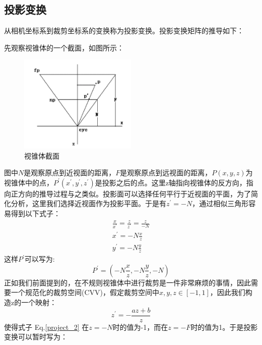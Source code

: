 	\subsection{投影变换}
	\begin{spacing}{2.5}
	从相机坐标系到裁剪坐标系的变换称为投影变换。投影变换矩阵的推导如下：
	\end{spacing}
		先观察视锥体的一个截面，如图所示：
		\begin{spacing}{2.5}
		\begin{figure}[H]
		\centering
		\includegraphics[width=0.5\textwidth]{images/project1.png}
		\caption{视锥体截面}
		\label{project1}
	\end{figure}
	图中$N$是观察原点到近视面的距离，$F$是观察原点到远视面的距离，$P(x,y,z)$为视锥体中的点，$P^{'}(x^{'},y^{'},z^{'})$是投影之后的点。这里z轴指向视锥体的反方向，指向正方向的推导过程与之类似。投影面可以选择任何平行于近视面的平面，为了简化分析，这里我们选择近视面作为投影平面。于是有$z^{'}=-N$，通过相似三角形容易得到以下式子：
	\begin{equation}
	\begin{split}
		\frac{x}{x^{'}}=\frac{z}{z^{'}}=\frac{z}{-N} \\
		x^{'} = -N\frac{x}{z} \\
		y^{'} = -N\frac{y}{z}
		\label{project_1}
	\end{split}
	\end{equation}
	这样$P^{'}$可以写为:
	\begin{equation}
		P^{'}=(-N\frac{x}{z},-N\frac{y}{z},-N)
	\end{equation}
	正如我们前面提到的，在不规则视锥体中进行裁剪是一件非常麻烦的事情，因此需要一个规范化的裁剪空间(CVV)，假定裁剪空间中$x,y,z\in[-1,1]$，因此我们构造z的一个映射：
	\begin{equation}
	z^{'}=-\frac{az+b}{z}
	\label{project_2}
	\end{equation}
	使得式子 Eq.\ref{project_2} 在$z=-N$时的值为-1，而在$z=-F$时的值为1。于是投影变换可以暂时写为：
	\begin{equation}

\end{equation}
\end{spacing}
